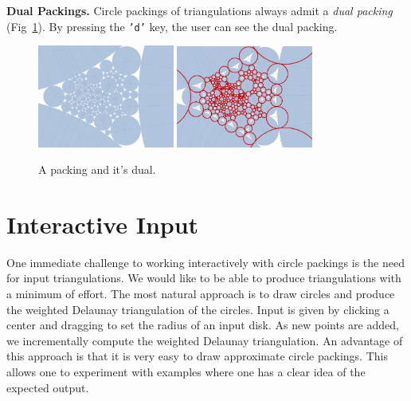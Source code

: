 \documentclass[a4paper,UKenglish]{lipics-v2016}
\begin{document}
  \textbf{Dual Packings.} 
  \label{sub:dual_packings}
    Circle packings of triangulations always admit a \emph{dual packing} (Fig~\ref{fig:primal_dual}).
    By pressing the \texttt{'d'} key, the user can see the dual packing.
    \begin{figure}[ht]
      \centering
        \includegraphics[width = 0.40\textwidth]{figures/primal.png}
        \includegraphics[width = 0.40\textwidth]{figures/dual.png}
      \caption{A packing and it's dual.}
      \label{fig:primal_dual}
    \end{figure}


\section{Interactive Input}
\label{sec:interactive_input}

  One immediate challenge to working interactively with circle packings is the need for input triangulations.
  We would like to be able to produce triangulations with a minimum of effort.  
  The most natural approach is to draw circles and produce the weighted Delaunay triangulation of the circles.
  Input is given by clicking a center and dragging to set the radius of an input disk.
  As new points are added, we incrementally compute the weighted Delaunay triangulation.
  An advantage of this approach is that it is very easy to draw approximate circle packings.  
  This allows one to experiment with examples where one has a clear idea of the expected output.
\end{document}
